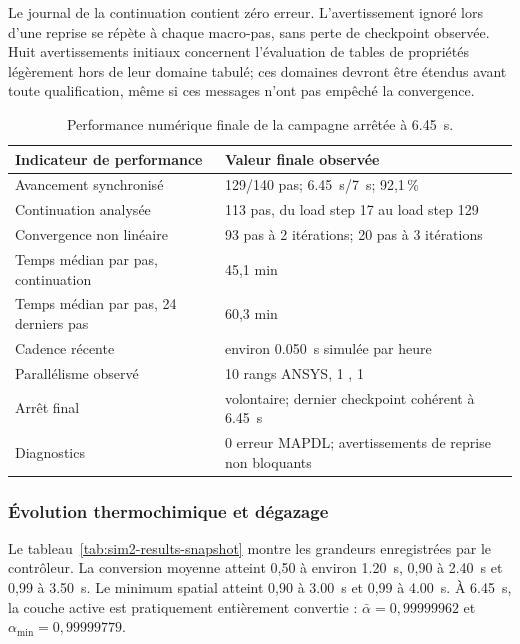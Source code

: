 \documentclass[oneside,openany]{amsdtx}
\begin{document}
Le journal de la continuation contient zéro erreur. L'avertissement
 ignoré lors d'une reprise se répète à chaque
macro-pas, sans perte de checkpoint observée. Huit avertissements initiaux
concernent l'évaluation de tables de propriétés légèrement hors de leur domaine
tabulé; ces domaines devront être étendus avant toute qualification, même si
ces messages n'ont pas empêché la convergence.

\begin{table}[H]
\centering
\small
\renewcommand{\arraystretch}{1.15}
\begin{tabular}{L{0.43\textwidth}L{0.43\textwidth}}
\toprule
\textbf{Indicateur de performance} & \textbf{Valeur finale observée} \\
\midrule
Avancement synchronisé & 129/140 pas; \SI{6.45}{s}/\SI{7}{s}; 92,1\,\% \\
Continuation analysée & 113 pas, du load step 17 au load step 129 \\
Convergence non linéaire & 93 pas à 2 itérations; 20 pas à 3 itérations \\
Temps médian par pas, continuation & 45,1 min \\
Temps médian par pas, 24 derniers pas & 60,3 min \\
Cadence récente & environ \SI{0.050}{s} simulée par heure \\
Parallélisme observé & 10 rangs ANSYS, 1 , 1  \\
Arrêt final & volontaire; dernier checkpoint cohérent à \SI{6.45}{s} \\
Diagnostics & 0 erreur MAPDL; avertissements de reprise non bloquants \\
\bottomrule
\end{tabular}
\caption{Performance numérique finale de la campagne arrêtée à
\SI{6.45}{s}.}
\label{tab:sim2-performance}
\end{table}

\subsubsection{Évolution thermochimique et dégazage}

Le tableau~\ref{tab:sim2-results-snapshot} montre les grandeurs enregistrées par
le contrôleur. La conversion moyenne atteint 0,50 à environ
\SI{1.20}{s}, 0,90 à \SI{2.40}{s} et 0,99 à \SI{3.50}{s}. Le minimum spatial
atteint 0,90 à \SI{3.00}{s} et 0,99 à \SI{4.00}{s}. À
\SI{6.45}{s}, la couche active est pratiquement entièrement convertie :
\(\bar\alpha=0{,}99999962\) et
\(\alpha_\mathrm{min}=0{,}99999779\).
\end{document}
